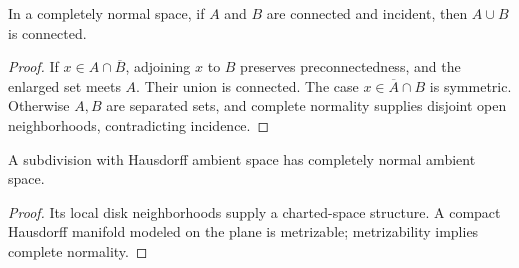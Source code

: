     \begin{lemma}\label{lem:incident-union-connected}

      In a completely normal space, if $A$ and $B$ are connected and incident,
      then $A \cup B$ is connected.
    \end{lemma}
    \begin{proof}

      If $x\in A\cap\overline B$, adjoining $x$ to $B$ preserves
      preconnectedness, and the enlarged set meets $A$. Their union is
      connected. The case $x\in\overline A\cap B$ is symmetric.
      Otherwise $A,B$ are separated sets, and complete normality supplies
      disjoint open neighborhoods, contradicting incidence.
    \end{proof}

    \begin{lemma}\label{lem:completely-normal}

      A subdivision with Hausdorff ambient space has completely normal
      ambient space.
    \end{lemma}
    \begin{proof}

      Its local disk neighborhoods supply a charted-space structure.
      A compact Hausdorff manifold modeled on the plane is metrizable;
      metrizability implies complete normality.
    \end{proof}

